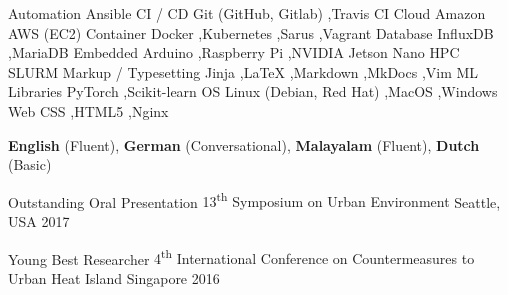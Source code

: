 \documentclass[11pt, a4paper]{preamble/awesome-cv-novo}
\begin{document}
\vspace{3mm}

  \begin{cvskills}

    \cvskill
      {Automation}
      {Ansible}
    \cvskill
      {CI / CD}
      {Git (GitHub, Gitlab) \sep Travis CI}
    \cvskill
      {Cloud}
      {Amazon AWS (EC2)}
    \cvskill
      {Container}
      {Docker \sep Kubernetes \sep Sarus \sep Vagrant}
    \cvskill
      {Database}
      {InfluxDB \sep MariaDB}
    \cvskill
      {Embedded}
      {Arduino \sep Raspberry Pi \sep NVIDIA Jetson Nano}
    \cvskill
      {HPC}
      {SLURM}
    \cvskill
      {Markup / Typesetting}
      {Jinja \sep LaTeX \sep Markdown \sep MkDocs \sep Vim}
    \cvskill
      {ML Libraries}
      {PyTorch \sep Scikit-learn}
    \cvskill
      {OS}
      {Linux (Debian, Red Hat) \sep MacOS \sep Windows}
    \cvskill
      {Web}
      {CSS \sep HTML5 \sep Nginx}
  \end{cvskills}



  \begin{cvlanguages}
      \cvlanguage
      {\textbf{English} (Fluent), \textbf{German} (Conversational), \textbf{Malayalam} (Fluent), \textbf{Dutch} (Basic)}
  \end{cvlanguages}



\begin{cvhonors}

  \cvhonor
    {Outstanding Oral Presentation} %
    {13\textsuperscript{th} Symposium on Urban Environment} %
    {Seattle, USA} %
    {2017} %

    \cvhonor
    {Young Best Researcher} %
    {4\textsuperscript{th} International Conference on Countermeasures to Urban Heat Island} %
    {Singapore} %
    {2016} %
\end{cvhonors}

\end{document}
